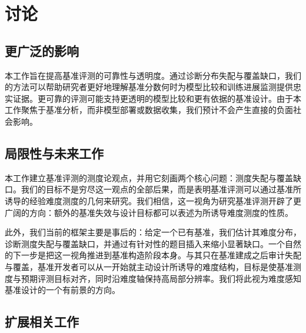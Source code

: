\newpage
\section{讨论}


\subsection{更广泛的影响}
\label{sec:app_impact}

本工作旨在提高基准评测的可靠性与透明度。通过诊断分布失配与覆盖缺口，我们的方法可以帮助研究者更好地理解基准分数何时为模型比较和训练进展监测提供忠实证据。更可靠的评测可能支持更透明的模型比较和更有依据的基准设计。由于本工作聚焦于基准分析，而非模型部署或数据收集，我们预计不会产生直接的负面社会影响。

\subsection{局限性与未来工作}
\label{sec:app_limitation}

本工作建立基准评测的测度论观点，并用它刻画两个核心问题：测度失配与覆盖缺口。我们的目标不是穷尽这一观点的全部后果，而是表明基准评测可以通过基准所诱导的经验难度测度的几何来研究。我们相信，这一视角为研究基准评测开辟了更广阔的方向：额外的基准失效与设计目标都可以表述为所诱导难度测度的性质。

此外，我们当前的框架主要是事后的：给定一个已有基准，我们估计其难度分布，诊断测度失配与覆盖缺口，并通过有针对性的题目插入来缩小显著缺口。一个自然的下一步是把这一视角推进到基准构造阶段本身。与其只在基准建成之后审计失配与覆盖，基准开发者可以从一开始就主动设计所诱导的难度结构，目标是使基准测度与预期评测目标对齐，同时沿难度轴保持高局部分辨率。我们将此视为难度感知基准设计的一个有前景的方向。

\subsection{扩展相关工作}


